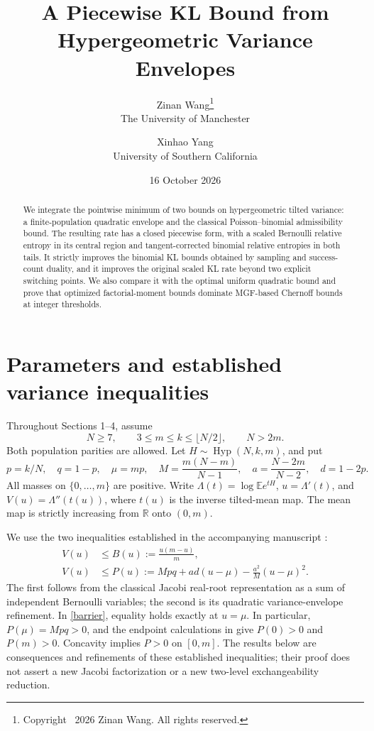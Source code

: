 \documentclass[11pt]{article}
\title{A Piecewise KL Bound from Hypergeometric Variance Envelopes}
\author{Zinan Wang\thanks{Copyright \textcopyright\ 2026 Zinan Wang. All rights reserved.}\\{\small The University of Manchester}\and Xinhao Yang\\{\small University of Southern California}}
\date{16 October 2026}
\DeclareMathOperator{\Hyp}{Hyp}
\newcommand{\E}{\mathbb E}
\begin{document}
\maketitle
\begin{abstract}
We integrate the pointwise minimum of two bounds on hypergeometric tilted
variance: a finite-population quadratic envelope and the classical
Poisson--binomial admissibility bound. The resulting rate has a closed
piecewise form, with a scaled Bernoulli relative entropy in its central
region and tangent-corrected binomial relative entropies in both tails.
It strictly improves the binomial KL bounds obtained by sampling and
success-count duality, and it improves the original scaled KL rate beyond
two explicit switching points. We also compare it with the optimal uniform
quadratic bound and prove that optimized factorial-moment bounds dominate
MGF-based Chernoff bounds at integer thresholds.
\end{abstract}

\section{Parameters and established variance inequalities}
Throughout Sections 1--4, assume
\begin{equation}\label{domain}
 N\ge7,\qquad 3\le m\le k\le\lfloor N/2\rfloor,\qquad N>2m.
\end{equation}
Both population parities are allowed. Let $H\sim\Hyp(N,k,m)$, and put
\[
 p=k/N,\quad q=1-p,\quad \mu=mp,\quad
 M=\frac{m(N-m)}{N-1},\quad a=\frac{N-2m}{N-2},\quad d=1-2p.
\]
All masses on $\{0,\ldots,m\}$ are positive. Write
$\Lambda(t)=\log\E e^{tH}$, $u=\Lambda'(t)$, and
$V(u)=\Lambda''(t(u))$, where $t(u)$ is the inverse tilted-mean map.
The mean map is strictly increasing from $\mathbb R$ onto $(0,m)$.

We use the two inequalities established in the accompanying manuscript
\cite{Wang}:
\begin{align}
 V(u)&\le B(u):=\frac{u(m-u)}m,\label{PB}\\
 V(u)&\le P(u):=Mpq+ad(u-\mu)-\frac{a^2}{M}(u-\mu)^2.
 \label{barrier}
\end{align}
The first follows from the classical Jacobi real-root representation as a
sum of independent Bernoulli variables; the second is its quadratic
variance-envelope refinement. In \eqref{barrier}, equality holds exactly
at $u=\mu$. In particular, $P(\mu)=Mpq>0$, and the endpoint calculations in
\cite{Wang} give $P(0)>0$ and $P(m)>0$. Concavity implies $P>0$ on $[0,m]$.
The results below are consequences and refinements of these established
inequalities; their proof does not assert a new Jacobi factorization or a
new two-level exchangeability reduction.
\end{document}
